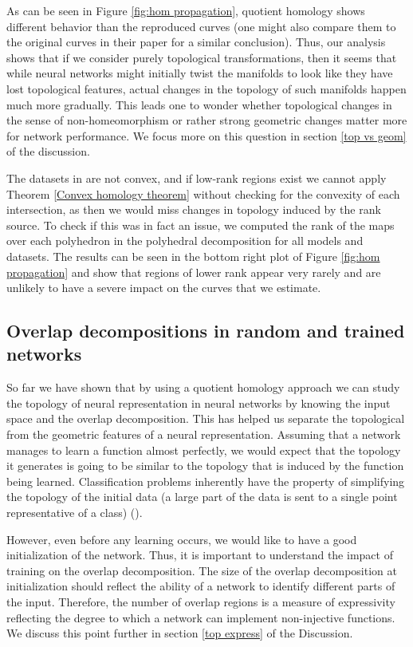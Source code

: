\documentclass[10pt]{article} %
\theoremstyle{plain}
\theoremstyle{definition}
\theoremstyle{remark}
\begin{document}
As can be seen in Figure \ref{fig:hom propagation}, quotient homology shows different behavior than the reproduced curves (one might also compare them to the original curves in their paper for a similar conclusion). Thus, our analysis shows that if we consider purely topological transformations, then it seems that while neural networks might initially twist the manifolds to look like they have lost topological features, actual changes in the topology of such manifolds happen much more gradually. This leads one to wonder whether topological changes in the sense of non-homeomorphism or rather strong geometric changes matter more for network performance. We focus more on this question in {section \ref{top vs geom} of} the discussion.

The datasets in \citet{naitzat2020topology} are not convex, and if low-rank regions exist we cannot apply Theorem \ref{Convex homology theorem} without checking for the convexity of each intersection, as then we would miss changes in topology induced by the rank source. To check if this was in fact an issue, we computed the rank of the maps over each polyhedron in the polyhedral decomposition for all models and datasets. The results can be seen in the bottom right plot of Figure \ref{fig:hom propagation} and show that regions of lower rank appear very rarely and are unlikely to have a severe impact on the curves that we estimate.

\subsection{Overlap decompositions in random and trained networks} 

\label{overlap trained random}
So far we have shown that by using a quotient homology approach we can study the topology of neural representation in neural networks by knowing the input space and the overlap decomposition. This has helped us separate the topological from the geometric features of a neural representation. Assuming that a network manages to learn a function almost perfectly, we would expect that the topology it generates is going to be similar to the topology that is induced by the function being learned. Classification problems inherently have the property of simplifying the topology of the initial data (a large part of the data is sent to a single point representative of a class) (\cite{papyan2020prevalence,rangamani2023feature}).

However, even before any learning occurs, we would like to have a good initialization of the network. Thus, it is important to understand the impact of training on the overlap decomposition. The size of the overlap decomposition at initialization should reflect the ability of a network to identify different parts of the input. Therefore, the number of overlap regions is a measure of expressivity reflecting the degree to which a network can implement non-injective functions. {We discuss this point further in section \ref{top express} of the Discussion.}
\end{document}
